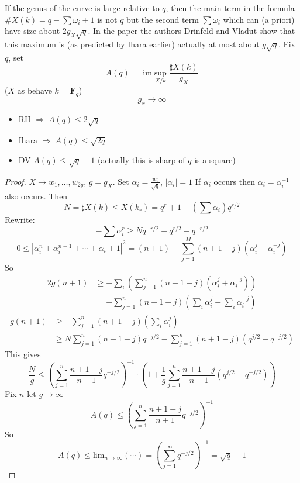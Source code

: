\noindent
If the genus of the curve is large relative to $q$, then the main
term in the formula $\#X(k) = q - \sum \omega_i + 1$ is not $q$
but the second term $\sum \omega_i$ which can (a priori) have
size about $2g_X\sqrt{q}$. In the paper \cite{Drinfeld-number}
the authors Drinfeld and Vladut show that this maximum is (as predicted
by Ihara earlier) actually at most about $g\sqrt{q}$. Fix $q$,
set
$$
A(q) = \text{lim}\sup_{X/k} \frac{\sharp X(k)}{g_X}
$$
($X$ as behave $k=\mathbf{F}_q$)
$$
g_x\to \infty
$$
\begin{itemize}
\item RH $\Rightarrow\; A(q)\leq 2\sqrt q$
\item Ihara $\Rightarrow\; A(q)\leq \sqrt{2q}$
\item DV $A(q)\leq \sqrt q-1$ (actually this is sharp of $q$ is a
square)
\end{itemize}

\begin{proof}
$X\to w_1, \ldots, w_{2g}$, $g=g_{X}$. Set
$\alpha_i=\frac{w_i}{\sqrt q}$, $|\alpha_i|=1$ If $\alpha_i$ occurs then
$\overline{\alpha}_i=\alpha_i^{-1}$ also occurs. Then
$$
N = \sharp X(k)\leq X(k_r) = q^r+1-(\sum\alpha_i)q^{r/2}
$$
Rewrite:
$$
-\sum\alpha_i^r\geq Nq^{-r/2}-q^{r/2}-q^{-r/2}
$$
$$
0\leq |\alpha_i^n +\alpha_i^{n-1} +\cdots +\alpha_i +1|^2
=(n+1)+\sum_{j=1}^M(n+1-j)(\alpha_i^j+\alpha_i^{-j})
$$
So
\begin{align*}
2g(n+1) &\geq -\sum_i \left(\sum_{j=1}^n (n+1-j)(\alpha_i^j
+\alpha_i^{-j})\right)\\
&=-\sum_{j=1}^n (n+1-j)\left(\sum_i\alpha_i^j
+\sum_i\alpha_i^{-j}\right)
\end{align*}
\begin{align*}
g(n+1)&\geq -\sum_{j=1}^n (n+1-j)(\sum_i\alpha_i^j)\\
&\geq N\sum_{j=1}^n (n+1-j)q^{-j/2}-\sum_{j=1}^n
(n+1-j)(q^{j/2}+q^{-j/2})
\end{align*}
This gives
$$
\frac{N}{g}\leq \left(\sum_{j=1}^n \frac{n+1-j}{n+1}q^{-j/2}
\right)^{-1}\cdot\left(1+\frac{1}{g}\sum_{j=1}^n\frac{n+1-j}{n+1}(q^{j/2}+q^{-j/
2})\right)
$$
Fix $n$ let $g\to \infty$
$$
A(q)\leq \left(\sum_{j=1}^n \frac{n+1-j}{n+1}q^{-j/2}\right)^{-1}
$$
So
$$
A(q)\leq \text{lim}_{n\to\infty}(\cdots) = \left(\sum_{j=1}^\infty
q^{-j/2}\right)^{-1}=\sqrt q-1
$$
\end{proof}











